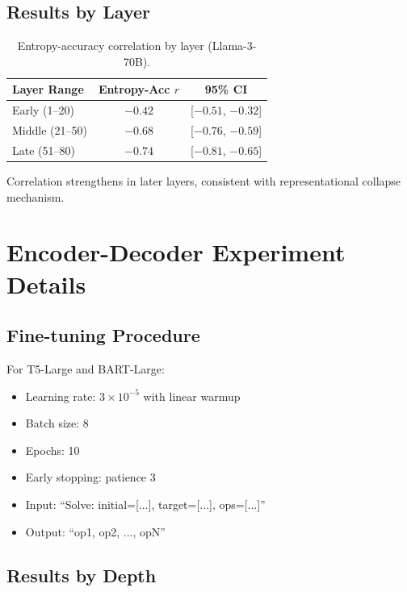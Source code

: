 \documentclass{article}
\theoremstyle{plain}
\theoremstyle{definition}
\theoremstyle{remark}
\begin{document}
\subsection{Results by Layer}

\begin{table}[h]
\centering
\caption{Entropy-accuracy correlation by layer (Llama-3-70B).}
\label{tab:entropy_layer}
\small
\begin{tabular}{@{}lcc@{}}
\toprule
\textbf{Layer Range} & \textbf{Entropy-Acc $r$} & \textbf{95\% CI} \\
\midrule
Early (1--20) & $-0.42$ & [$-0.51$, $-0.32$] \\
Middle (21--50) & $-0.68$ & [$-0.76$, $-0.59$] \\
Late (51--80) & $-0.74$ & [$-0.81$, $-0.65$] \\
\bottomrule
\end{tabular}
\end{table}

Correlation strengthens in later layers, consistent with representational collapse mechanism.


\section{Encoder-Decoder Experiment Details}
\label{app:enc_dec}

\subsection{Fine-tuning Procedure}

For T5-Large and BART-Large:
\begin{itemize}
\item Learning rate: $3 \times 10^{-5}$ with linear warmup
\item Batch size: 8
\item Epochs: 10
\item Early stopping: patience 3
\item Input: ``Solve: initial=[...], target=[...], ops=[...]''
\item Output: ``op1, op2, ..., opN''
\end{itemize}

\subsection{Results by Depth}
\end{document}

